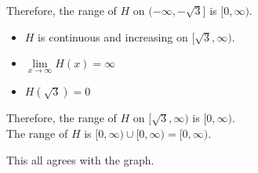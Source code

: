 \documentclass{ximera}
\begin{document}
Therefore, the range of $H$ on $( -\infty, -\sqrt{3} ]$ is $[0, \infty)$. \\




\begin{itemize}
\item $H$ is continuous and increasing on $[ \sqrt{3} ,\infty)$. \\
\item $\lim\limits_{x \to \infty} H(x) = \infty$ \\
\item $H(\sqrt{3}) = 0$
\end{itemize}

Therefore, the range of $H$ on $[ \sqrt{3}, \infty )$ is $[0, \infty)$. \\








The range of $H$ is $[0, \infty) \cup [0, \infty) = [0, \infty)$.




This all agrees with the graph. \\
\end{document}
